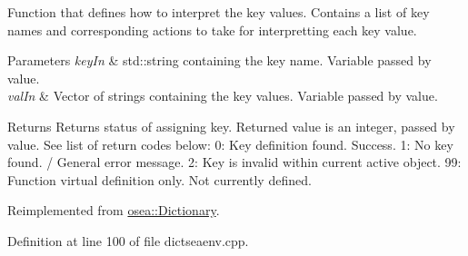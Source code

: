 Function that defines how to interpret the key values. Contains a list of key names and corresponding actions to take for interpretting each key value. 


\begin{DoxyParams}{Parameters}
{\em key\-In} & std\-::string containing the key name. Variable passed by value. \\
\hline
{\em val\-In} & Vector of strings containing the key values. Variable passed by value. \\
\hline
\end{DoxyParams}
\begin{DoxyReturn}{Returns}
Returns status of assigning key. Returned value is an integer, passed by value. See list of return codes below\-: 0\-: Key definition found. Success. 1\-: No key found. / General error message. 2\-: Key is invalid within current active object. 99\-: Function virtual definition only. Not currently defined. 
\end{DoxyReturn}


Reimplemented from \hyperlink{classosea_1_1_dictionary_ae96470181c8b1762204493fa45e96d7c}{osea\-::\-Dictionary}.



Definition at line 100 of file dictseaenv.\-cpp.



